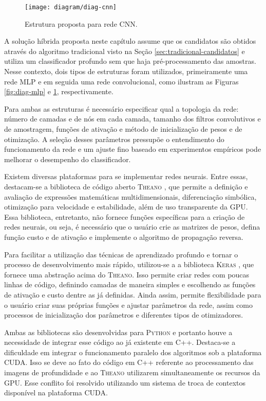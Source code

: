 \begin{figure}
\centering
\texttt{[image: diagram/diag-cnn]}
\caption{Estrutura proposta para rede CNN.}
\label{fig:diag-cnn}
\end{figure}

A solução híbrida proposta neste capítulo assume que os candidatos são obtidos através do algoritmo tradicional visto na Seção \ref{sec:tradicional-candidatos} e utiliza um classificador profundo sem que haja pré-processamento das amostras. Nesse contexto, dois tipos de estruturas foram utilizados, primeiramente uma rede MLP e em seguida uma rede convolucional, como ilustram as Figuras \ref{fig:diag-mlp} e \ref{fig:diag-cnn}, respectivamente. 

Para ambas as estruturas é necessário especificar qual a topologia da rede: número de camadas e de nós em cada camada, tamanho dos filtros convolutivos e de amostragem, funções de ativação e método de inicialização de pesos e de otimização.  A seleção desses parâmetros pressupõe o entendimento do funcionamento da rede e um ajuste fino baseado em experimentos empíricos pode melhorar o desempenho do classificador.

Existem diversas plataformas para se implementar redes neurais. Entre essas, destacam-se a biblioteca de código aberto \textsc{Theano} \cite{theano}, que permite a definição e avaliação de expressões matemáticas multidimensionais, diferenciação simbólica, otimização para velocidade e estabilidade, além de uso transparente da GPU. Essa biblioteca, entretanto, não fornece funções específicas para a criação de redes neurais, ou seja, é necessário que o usuário crie as matrizes de pesos, defina função custo e de ativação e implemente o algoritmo de propagação reversa.

Para facilitar a utilização das técnicas de aprendizado profundo e tornar o processo de desenvolvimento mais rápido, utilizou-se a a biblioteca \textsc{Keras} \cite{keras}, que fornece uma abstração acima do \textsc{Theano}. Isso permite criar redes com poucas linhas de código, definindo camadas de maneira simples e escolhendo as funções de ativação e custo dentre as já definidas. Ainda assim, permite flexibilidade para o usuário criar suas próprias funções e ajustar parâmetros da rede, assim como processos de inicialização dos parâmetros e diferentes tipos de otimizadores.

Ambas as bibliotecas são desenvolvidas para \textsc{Python} e portanto houve a necessidade de integrar esse código ao já existente em C++. Destaca-se a dificuldade em integrar o funcionamento paralelo dos algoritmos sob a plataforma CUDA. Isso se deve ao fato do código em C++ referente ao processamento das imagens de profundidade e ao \textsc{Theano} utilizarem simultaneamente os recursos da GPU. Esse conflito foi resolvido utilizando um sistema de troca de contextos disponível na plataforma CUDA.

